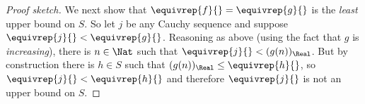 \begin{proof}[Proof sketch]
We next show that $\equivrep{f}{} = \equivrep{g}{}$ is the \emph{least} upper bound on $S$. So let $j$ be any Cauchy sequence and suppose $\equivrep{j}{} < \equivrep{g}{}$. Reasoning as above (using the fact that $g$ is \emph{increasing}), there is $n \in \Nat$ such that $\equivrep{j}{} < (g(n))_\Real$. But by construction there is $h \in S$ such that $(g(n))_\Real \leq \equivrep{h}{}$, so $\equivrep{j}{} < \equivrep{h}{}$ and therefore $\equivrep{j}{}$ is not an upper bound on $S$.  
\end{proof}



\OLEndChapterHook






